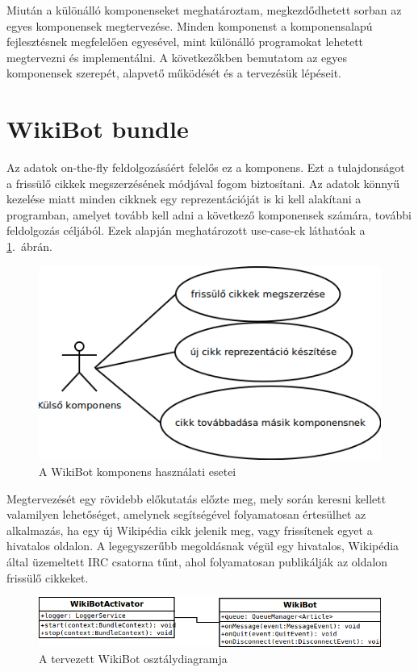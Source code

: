 Miután a különálló komponenseket meghatároztam, megkezdődhetett sorban az egyes komponensek megtervezése. Minden komponenst a komponensalapú fejlesztésnek megfelelően egyesével, mint különálló programokat lehetett megtervezni és implementálni. A következőkben bemutatom az egyes komponensek szerepét, alapvető működését és a tervezésük lépéseit.

\section{WikiBot bundle}
\label{sec:wikibotbundle}

Az adatok on-the-fly feldolgozásáért felelős ez a komponens. Ezt a tulajdonságot a frissülő cikkek megszerzésének módjával fogom biztosítani. Az adatok könnyű kezelése miatt minden cikknek egy reprezentációját is ki kell alakítani a programban, amelyet tovább kell adni a következő komponensek számára, további feldolgozás céljából. Ezek alapján meghatározott use-case-ek láthatóak a \ref{fig:usecase_wikiBot}.~ábrán.

\begin{figure}[htp]
\centering
\includegraphics[scale=0.5]{img/usecase_wikiBot}
\caption{A WikiBot komponens használati esetei}
\label{fig:usecase_wikiBot}
\end{figure}

Megtervezését egy rövidebb előkutatás előzte meg, mely során keresni kellett valamilyen lehetőséget, amelynek segítségével folyamatosan értesülhet az alkalmazás, ha egy új Wikipédia cikk jelenik meg, vagy frissítenek egyet a hivatalos oldalon. A legegyszerűbb megoldásnak végül egy hivatalos, Wikipédia által üzemeltett IRC csatorna tűnt, ahol folyamatosan publikálják az oldalon frissülő cikkeket.

\begin{figure}[htp]
\centering
\includegraphics[scale=0.5]{img/class_wikiBot}
\caption{A tervezett WikiBot osztálydiagramja}
\label{fig:class_wikiBot}
\end{figure}

